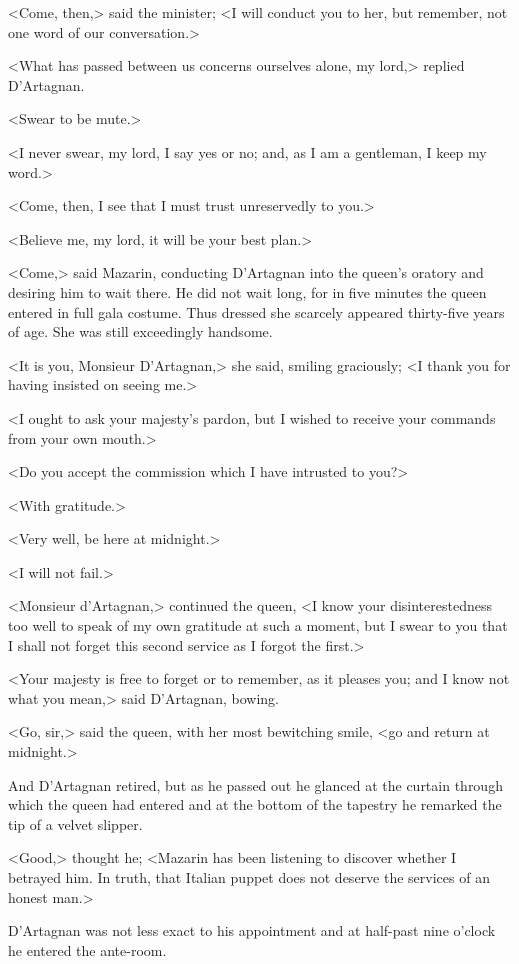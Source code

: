 <Come, then,> said the minister; <I will conduct you to her, but remember, not one word of our conversation.>

<What has passed between us concerns ourselves alone, my lord,> replied D'Artagnan.

<Swear to be mute.>

<I never swear, my lord, I say yes or no; and, as I am a gentleman, I keep my word.>

<Come, then, I see that I must trust unreservedly to you.>

<Believe me, my lord, it will be your best plan.>

<Come,> said Mazarin, conducting D'Artagnan into the queen's oratory and desiring him to wait there. He did not wait long, for in five minutes the queen entered in full gala costume. Thus dressed she scarcely appeared thirty-five years of age. She was still exceedingly handsome.

<It is you, Monsieur D'Artagnan,> she said, smiling graciously; <I thank you for having insisted on seeing me.>

<I ought to ask your majesty's pardon, but I wished to receive your commands from your own mouth.>

<Do you accept the commission which I have intrusted to you?>

<With gratitude.>

<Very well, be here at midnight.>

<I will not fail.>

<Monsieur d'Artagnan,> continued the queen, <I know your disinterestedness too well to speak of my own gratitude at such a moment, but I swear to you that I shall not forget this second service as I forgot the first.>

<Your majesty is free to forget or to remember, as it pleases you; and I know not what you mean,> said D'Artagnan, bowing.

<Go, sir,> said the queen, with her most bewitching smile, <go and return at midnight.>

And D'Artagnan retired, but as he passed out he glanced at the curtain through which the queen had entered and at the bottom of the tapestry he remarked the tip of a velvet slipper.

<Good,> thought he; <Mazarin has been listening to discover whether I betrayed him. In truth, that Italian puppet does not deserve the services of an honest man.>

D'Artagnan was not less exact to his appointment and at half-past nine o'clock he entered the ante-room.

